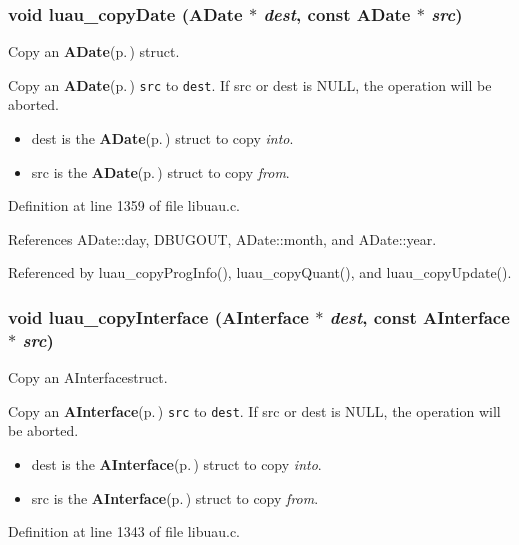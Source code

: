 \subsubsection{\setlength{\rightskip}{0pt plus 5cm}void luau\_\-copy\-Date ({\bf ADate} $\ast$ {\em dest}, const {\bf ADate} $\ast$ {\em src})}\label{libuau_8h_a92}


Copy an {\bf ADate}{\rm (p.\,\pageref{structADate})} struct. 

Copy an {\bf ADate}{\rm (p.\,\pageref{structADate})} {\tt src} to {\tt dest}. If src or dest is NULL, the operation will be aborted.

\begin{itemize}
\item dest is the {\bf ADate}{\rm (p.\,\pageref{structADate})} struct to copy {\em into\/}. \item src is the {\bf ADate}{\rm (p.\,\pageref{structADate})} struct to copy {\em from\/}. \end{itemize}


Definition at line 1359 of file libuau.c.

References ADate::day, DBUGOUT, ADate::month, and ADate::year.

Referenced by luau\_\-copy\-Prog\-Info(), luau\_\-copy\-Quant(), and luau\_\-copy\-Update().
\subsubsection{\setlength{\rightskip}{0pt plus 5cm}void luau\_\-copy\-Interface ({\bf AInterface} $\ast$ {\em dest}, const {\bf AInterface} $\ast$ {\em src})}\label{libuau_8h_a91}


Copy an AInterfacestruct. 

Copy an {\bf AInterface}{\rm (p.\,\pageref{structAInterface})} {\tt src} to {\tt dest}. If src or dest is NULL, the operation will be aborted.

\begin{itemize}
\item dest is the {\bf AInterface}{\rm (p.\,\pageref{structAInterface})} struct to copy {\em into\/}. \item src is the {\bf AInterface}{\rm (p.\,\pageref{structAInterface})} struct to copy {\em from\/}. \end{itemize}


Definition at line 1343 of file libuau.c.

